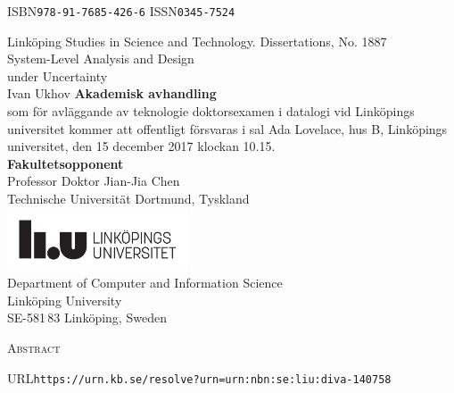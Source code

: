 \documentclass[a4paper,oneside,showtrims]{memoir}
\newcommand{\resetlayout}{
  \setlength{\trimtop}{\stockheight}
  \addtolength{\trimtop}{-\paperheight}
  \setlength{\trimedge}{\stockwidth}
  \addtolength{\trimedge}{-\paperwidth}
  \settrims{0.5\trimtop}{0.5\trimedge}
  \setlrmargins{*}{*}{*}
  \setulmargins{2cm}{*}{*}
}
\begin{document}
  \resetlayout
  \checkandfixthelayout
  \pagestyle{empty}
    {ISBN\hspace{0.5em}\texttt{978-91-7685-426-6}}{}
    {ISSN\hspace{0.5em}\texttt{0345-7524}}
  \thispagestyle{plain}
  \begin{center}
    {
      \small
      Linköping Studies in Science and Technology. Dissertations, No. 1887
    }\\[6em]
    {
      \headingfont
      \Huge
      System-Level Analysis and Design\\[0.2em]
      under Uncertainty
    }\\[3em]
    {
      \headingfont
      \huge
      Ivan Ukhov
    }
    \vfill
    {
      \textbf{Akademisk avhandling}\\[0.5em]
      som för avläggande av teknologie doktorsexamen i datalogi vid Linköpings
      universitet kommer att offentligt försvaras i sal Ada Lovelace, hus B,
      Linköpings universitet, den 15 december 2017 klockan 10.15.
    }\\[2em]
    {
      \textbf{Fakultetsopponent}\\[0.5em]
      Professor Doktor Jian-Jia Chen\\
      Technische Universität Dortmund, Tyskland
    }\\[2em]
    \vfill
    \includegraphics[height=5em]{include/assets/other/logo-swedish}\\[2em]
    {
      \small
      Department of Computer and Information Science\\
      Linköping University\\
      SE-581\,83 Linköping, Sweden
    }
  \end{center}
  \clearpage
  {
    \centerline{\Large\textsc{Abstract}}
    \vspace{1em}
    \noindent
    
  }
  \vfill
  \noindent
  URL\hspace{0.5em}\texttt{https://urn.kb.se/resolve?urn=urn:nbn:se:liu:diva-140758}
\end{document}
